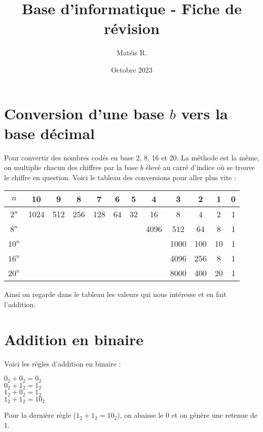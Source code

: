 \documentclass{article}
\title{Base d'informatique - Fiche de révision}
\author{Matéis R.}
\date{Octobre 2023}
\begin{document}
	\maketitle

	\section{Conversion d'une base $b$ vers la base décimal}
		Pour convertir des nombres codés en base 2, 8, 16 et 20. La méthode est la même, on multiplie chacun des chiffres par la base $b$ élevé au carré d'indice où se trouve le chiffre en question. Voici le tableau des conversions pour aller plus vite :  
		
		\begin{center}
			\begin{tabular}{ | c | c | c | c | c | c | c | c | c | c | c | c | }
  				\hline
					$n$ & 10 & 9 & 8 & 7 & 6 & 5 & 4 & 3 & 2 & 1 & 0 \\ 
 				\hline
  					 $2^n$ & 1024 & 512 & 256 & 128 & 64 & 32 & 16 & 8 & 4 & 2 & 1 \\ 
	  			\hline
					$8^n$ & & & & & & & 4096 & 512 & 64 & 8 & 1 \\
				\hline
					$10^n$ & & & & & & & & 1000 & 100 & 10 & 1 \\
				\hline
					$16^n$ & & & & & & & & 4096 & 256 & 8 &1 \\
				\hline
					$20^n$ & & & & & & & & 8000 & 400 & 20 & 1 \\
				\hline
			\end{tabular}
		\end{center}
		
		Ainsi on regarde dans le tableau les valeurs qui nous intéresse et en fait l'addition.
	
	\section{Addition en binaire}
		Voici les règles d'addition en binaire :
		
		\begin{center}
			$0_2 + 0_2 = 0_2$ \\
			$0_2 + 1_2 = 1_2$ \\
			$1_2 + 0_2 = 1_2$ \\
			$1_2 + 1_2 = 10_2$ \\
		\end{center}	
		Pour la dernière règle ($1_2 + 1_2 = 10_2$), on abaisse le 0 et on génère une retenue de 1.
\end{document}
